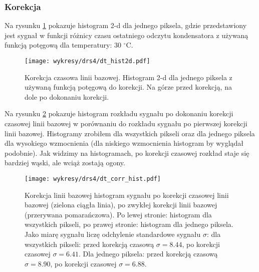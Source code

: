 \documentclass[a4paper,11pt,twoside]{article}
\begin{document}
\subsubsection{Korekcja}
Na rysunku \ref{fig:dt_corr_hist2d} pokazuje histogram 2-d dla jednego piksela, gdzie przedstawiony jest sygnał w funkcji różnicy czasu ostatniego odczytu kondensatora z używaną funkcją potęgową dla temperatury: 30 $^{\circ}$C. 
\begin{figure}[H] 
\centering
\texttt{[image: wykresy/drs4/dt\_hist2d.pdf]}
\caption{Korekcja czasowa linii bazowej. Histogram 2-d dla jednego piksela z używaną funkcją potęgową do korekcji. Na górze przed korekcją, na dole po dokonaniu korekcji.}
\label{fig:dt_corr_hist2d}
\end{figure}
Na rysunku \ref{fig:baseline_corr_hist} pokazuje histogram rozkładu sygnału po dokonaniu korekcji czasowej linii bazowej w porównaniu do rozkładu sygnału po pierwszej korekcji linii bazowej. Histogramy zrobiłem dla wszystkich pikseli oraz dla jednego piksela dla wysokiego wzmocnienia (dla niskiego wzmocnienia histogram by wyglądał podobnie). Jak widzimy na histogramach, po korekcji czasowej rozkład staje się bardziej wąski, ale wciąż zostają ogony.  
\begin{figure}[H] 
\centering
\texttt{[image: wykresy/drs4/dt\_corr\_hist.pdf]}
\caption{Korekcja linii bazowej histogram sygnału po korekcji czasowej linii bazowej (zielona ciągła linia), po zwykłej korekcji linii bazowej (przerywana pomarańczowa). Po lewej stronie: histogram dla wszystkich pikseli, po prawej stronie: histogram dla jednego piksela. Jako miarę sygnału liczę odchylenie standardowe sygnału $\sigma$: dla wszystkich pikseli: przed korekcją czasową $\sigma = 8.44$, po korekcji czasowej $\sigma = 6.41$. Dla jednego piksela: przed korekcją czasową $\sigma = 8.90$, po korekcji czasowej $\sigma = 6.88$. }
\label{fig:baseline_corr_hist}
\end{figure}
\newpage
\end{document}

